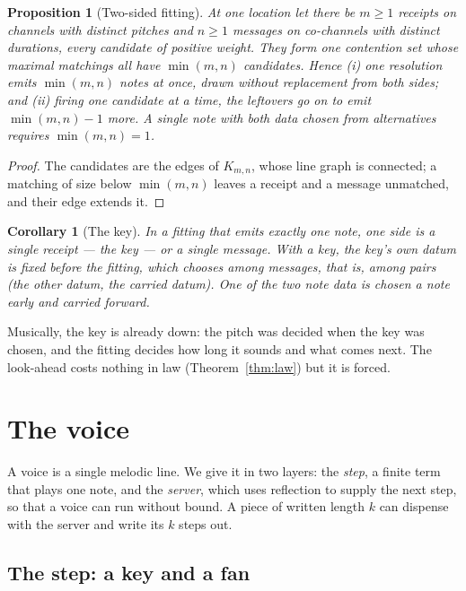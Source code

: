 \documentclass[11pt,a4paper]{article}
\theoremstyle{plain}
\newtheorem{proposition}[theorem]{Proposition}
\newtheorem{corollary}[theorem]{Corollary}
\theoremstyle{definition}
\theoremstyle{remark}
\begin{document}
\begin{proposition}[Two-sided fitting]\label{prop:twosided}
At one location let there be $m \geq 1$ receipts on channels with distinct
pitches and $n \geq 1$ messages on co-channels with distinct durations, every
candidate of positive weight. They form one contention set whose maximal
matchings all have $\min(m,n)$ candidates. Hence (i) one resolution emits
$\min(m,n)$ notes at once, drawn without replacement from both sides; and (ii)
firing one candidate at a time, the leftovers go on to emit $\min(m,n)-1$ more.
A single note with both data chosen from alternatives requires $\min(m,n)=1$.
\end{proposition}
\begin{proof}
The candidates are the edges of $K_{m,n}$, whose line graph is connected; a
matching of size below $\min(m,n)$ leaves a receipt and a message unmatched,
and their edge extends it.
\end{proof}

\begin{corollary}[The key]\label{cor:key}
In a fitting that emits exactly one note, one side is a single receipt --- the
\emph{key} --- or a single message. With a key, the key's own datum is fixed
before the fitting, which chooses among messages, that is, among pairs (the
other datum, the carried datum). One of the two note data is chosen a note
early and carried forward.
\end{corollary}

Musically, the key is already down: the pitch was decided when the key was
chosen, and the fitting decides how long it sounds and what comes next. The look-ahead costs nothing in law
(Theorem~\ref{thm:law}) but it is forced.

\section{The voice}\label{sec:voice}

A voice is a single melodic line. We give it in two layers: the \emph{step}, a
finite term that plays one note, and the \emph{server}, which uses reflection to
supply the next step, so that a voice can run without bound. A piece of written
length $k$ can dispense with the server and write its $k$ steps out.

\subsection{The step: a key and a fan}
\end{document}
